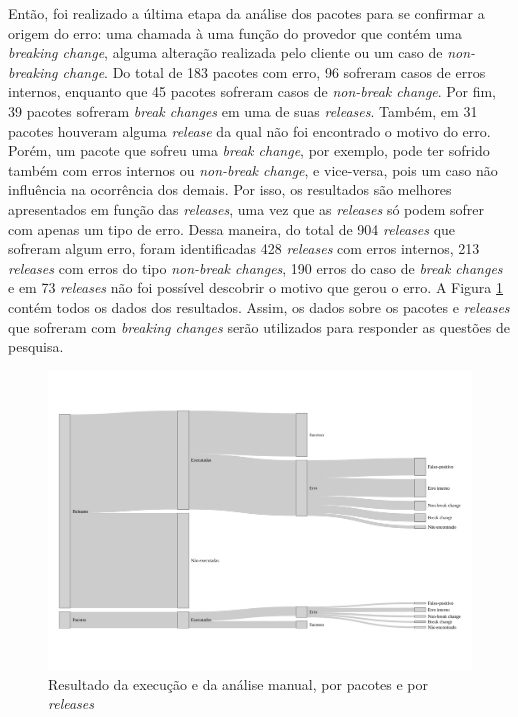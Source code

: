 Então, foi realizado a última etapa da análise dos pacotes para se confirmar a origem do erro: uma chamada à uma função do provedor que contém uma \textit{breaking change}, alguma alteração realizada pelo cliente ou um caso de \textit{non-breaking change}. Do total de 183 pacotes com erro, 96 sofreram casos de erros internos, enquanto que 45 pacotes sofreram casos de \textit{non-break change}. Por fim, 39 pacotes sofreram \textit{break changes} em uma de suas \textit{releases}. Também, em 31 pacotes houveram alguma \textit{release} da qual não foi encontrado o motivo do erro. Porém, um pacote que sofreu uma \textit{break change}, por exemplo, pode ter sofrido também com erros internos ou \textit{non-break change}, e vice-versa, pois um caso não influência na ocorrência dos demais. Por isso, os resultados são melhores apresentados em função das \textit{releases}, uma vez que as \textit{releases} só podem sofrer com apenas um tipo de erro. Dessa maneira, do total de 904 \textit{releases} que sofreram algum erro, foram identificadas 428 \textit{releases} com erros internos, 213 \textit{releases} com erros do tipo \textit{non-break changes}, 190 erros do caso de \textit{break changes} e em 73 \textit{releases} não foi possível descobrir o motivo que gerou o erro. A Figura \ref{fig:res_rq1_g} contém todos os dados dos resultados. Assim, os dados sobre os pacotes e \textit{releases} que sofreram com \textit{breaking changes} serão utilizados para responder as questões de pesquisa.

\begin{figure}
    \centering
    \includegraphics[scale=0.5]{figuras/general_results.pdf}
    \caption{Resultado da execução e da análise manual, por pacotes e por \textit{releases}}
    \label{fig:res_rq1_g}
\end{figure}{}


